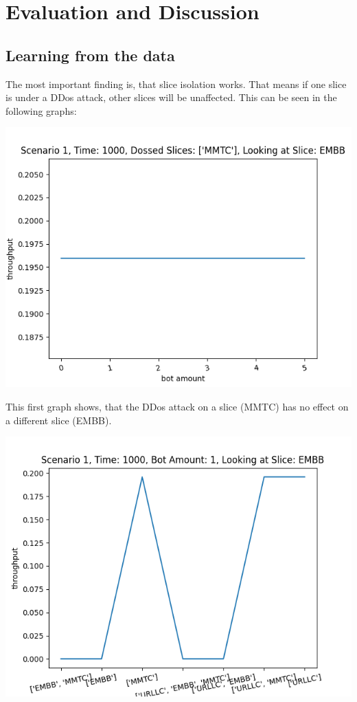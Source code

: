 
\chapter{Evaluation and Discussion}
\label{chapter:evaluation}
\section{Learning from the data}
    The most important finding is, that slice isolation works. That means if one slice is under a DDos attack, other slices will be unaffected. This can be seen in the following graphs:
    
    \includegraphics[width=\textwidth]{img/slice_isolation_works_single.png}
    
    This first graph shows, that the DDos attack on a slice (MMTC) has no effect on a different slice (EMBB).
    
    \includegraphics[width=\textwidth]{img/slice_isolation_works_dossed_slices.png}
    
